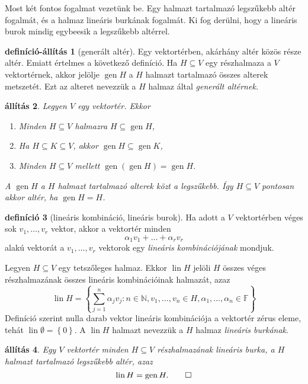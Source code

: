 \documentclass[9pt, a4paper, showtrims]{memoir}
\theoremstyle{plain}
\newtheorem{proposition}{állítás}[chapter]
\theoremstyle{remark}
\theoremstyle{definition}
\newtheorem{definition}[proposition]{definíció}
\newtheorem{defprop}[proposition]{definíció-állítás}
\DeclareMathOperator{\lin}{lin}
\DeclareMathOperator{\gen}{gen}
\begin{document}
Most két fontos fogalmat vezetünk be.
Egy halmazt tartalmazó legszűkebb altér fogalmát,
és a halmaz lineáris burkának fogalmát. 
Ki fog derülni, hogy a lineáris burok mindig egybeesik a legszűkebb altérrel.
\begin{defprop}[generált altér]
    Egy vektortérben, akárhány altér közös része altér.
    Emiatt értelmes a következő definíció.
    Ha $H\subseteq V$ egy részhalmaza a $V$ vektortérnek,
    akkor jelölje 
    $\gen H$ a $H$ halmazt tartalmazó összes alterek metszetét.
    Ezt az alteret nevezzük a $H$ halmaz által \emph{generált altérnek.}
\end{defprop}
\begin{proposition}
    Legyen $V$ egy vektortér.
    Ekkor
    \begin{enumerate}
        \item Minden $H\subseteq V$ halmazra $H\subseteq \gen H$,
        \item Ha $H\subseteq K\subseteq V$, akkor $\gen H\subseteq \gen K$,
        \item Minden $H\subseteq V$ mellett $\gen\left( \gen H \right)=\gen H$.
    \end{enumerate}
    A $\gen H$ a $H$ halmazt tartalmazó alterek közt a legszűkebb.
    Így $H\subseteq V$ pontosan akkor altér, ha $\gen H=H$.
\end{proposition}
\begin{definition}[lineáris kombináció, lineáris burok]
    Ha adott a $V$ vektortérben véges sok $v_1,\dots,v_r$ vektor,
    akkor a vektortér minden
    \[
        \alpha_1v_1+\dots+\alpha_r v_r
    \]
    alakú vektorát a $v_1,\dots,v_r$ vektorok egy \emph{lineáris kombinációjának} mondjuk.

    Legyen $H\subseteq V$ egy tetszőleges halmaz.
    Ekkor $\lin H$ jelöli $H$ összes véges részhalmazának összes lineáris kombinációinak halmazát,
    azaz
    \[
        \lin H=
        \left\{ \sum_{j=1}^n\alpha_jv_j:n\in\mathbb{N},v_1,\dots,v_n\in H,\alpha_1,\dots,\alpha_n\in\mathbb{F} \right\}
    \]
    Definíció szerint nulla darab vektor lineáris kombinációja a vektortér zérus eleme, 
    tehát $\lin \emptyset=\left\{ 0 \right\}.$
    A $\lin H$ halmazt nevezzük a $H$ halmaz \emph{lineáris burkának}.
\end{definition}
\begin{proposition}
    Egy $V$ vektortér minden $H\subseteq V$ részhalmazának lineáris burka, 
    a $H$ halmazt tartalmazó legszűkebb altér, azaz
    \[
        \lin H=\gen H.\qedhere
    \]
\end{proposition}
\end{document}
